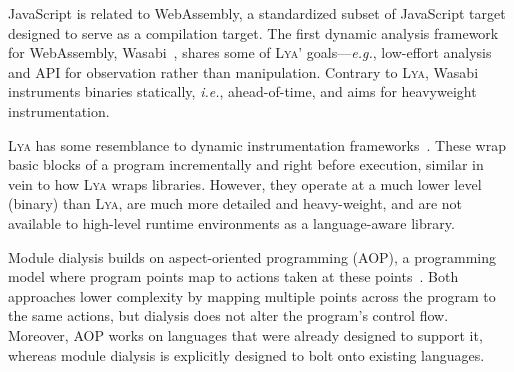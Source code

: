 \documentclass[letterpaper,twocolumn,10pt]{article}
\def\eg{{\em e.g.}, }
\def\ie{{\em i.e.}, }
\newcommand{\sx}[1]{(\S\ref{#1})}
\newcommand{\sys}{{\scshape Lya}\xspace}
\newcommand{\fixme}[1]{{\color{red}#1}}
\begin{document}

JavaScript is related to WebAssembly, a standardized subset of JavaScript target designed to serve as a compilation target.
The first dynamic analysis framework for WebAssembly, Wasabi~\cite{wasabi}, shares some of \sys' goals---\eg low-effort analysis and API for observation rather than manipulation.
Contrary to \sys, Wasabi instruments binaries statically, \ie ahead-of-time, and aims for heavyweight instrumentation.

\sys has some resemblance to dynamic instrumentation frameworks~\cite{pin, valgrind, disl, roadrunner}.
These wrap basic blocks of a program incrementally and right before execution, similar in vein to how \sys wraps libraries.
However, they operate at a much lower level (binary) than \sys, are much more detailed and heavy-weight, and are not available to high-level runtime environments as a language-aware library.

Module dialysis builds on aspect-oriented programming (AOP), a programming model where program points map to actions taken at these points~\cite{aop}.
Both approaches lower complexity by mapping multiple points across the program to the same actions, but dialysis does not alter the program's control flow.
Moreover, AOP works on languages that were already designed to support it, whereas module dialysis is explicitly designed to bolt onto existing languages.
\end{document}
